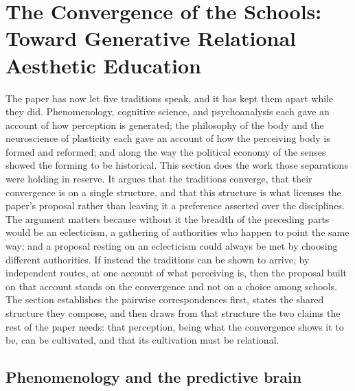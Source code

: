 \section{The Convergence of the Schools: Toward Generative Relational Aesthetic Education}
\label{p23:sec:convergence}

\noindent
The paper has now let five traditions speak, and it has kept them apart while they did. Phenomenology, cognitive science, and psychoanalysis each gave an account of how perception is generated; the philosophy of the body and the neuroscience of plasticity each gave an account of how the perceiving body is formed and reformed; and along the way the political economy of the senses showed the forming to be historical. This section does the work those separations were holding in reserve. It argues that the traditions converge, that their convergence is on a single structure, and that this structure is what licenses the paper's proposal rather than leaving it a preference asserted over the disciplines. The argument matters because without it the breadth of the preceding parts would be an eclecticism, a gathering of authorities who happen to point the same way; and a proposal resting on an eclecticism could always be met by choosing different authorities. If instead the traditions can be shown to arrive, by independent routes, at one account of what perceiving is, then the proposal built on that account stands on the convergence and not on a choice among schools. The section establishes the pairwise correspondences first, states the shared structure they compose, and then draws from that structure the two claims the rest of the paper needs: that perception, being what the convergence shows it to be, can be cultivated, and that its cultivation must be relational.

\subsection{Phenomenology and the predictive brain}
\label{p23:sub:conv-phenom-predictive}

